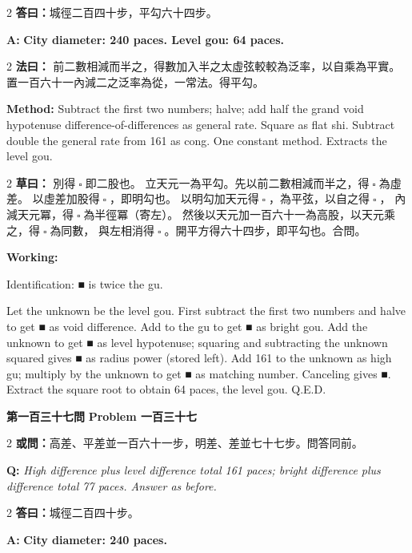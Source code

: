 \documentclass[11pt,a4paper]{article}
\let\origsquare\square
\renewcommand{\square}{\ensuremath{\origsquare}}%
\newcommand{\wen}[1]{%
  \par\vspace{0.5em}%
  \noindent\textcolor{problemcolor}{\textbf{第#1問}}%
  \hfill\textcolor{problemcolor}{\textbf{Problem #1}}\par\nopagebreak%
  \vspace{0.3em}%
}
\newcommand{\owen}[1]{%
  \noindent\textcolor{problemcolor}{\textbf{或問：}}{\tradfont #1}\par\nopagebreak%
}
\newcommand{\oweneng}[1]{%
  \noindent\textcolor{engcolor}{\textbf{Q: }}{\itshape #1}\par\nopagebreak%
}
\newcommand{\fayue}[1]{%
  \noindent\textcolor{methodcolor}{\textbf{法曰：}}{\tradfont #1}\par\nopagebreak%
}
\newcommand{\fayueeng}[1]{%
  \noindent\textcolor{engcolor}{\textbf{Method: }}{#1}\par\nopagebreak%
}
\newcommand{\tsaoyue}[1]{%
  \noindent\textcolor{workcolor}{\textbf{草曰：}}{\tradfont #1}\par%
}
\newcommand{\tsaoyueeng}[1]{%
  \noindent\textcolor{engcolor}{\textbf{Working: }}{\small #1}\par%
}
\newcommand{\dayue}[1]{%
  \noindent\textcolor{anscolor}{\textbf{答曰：}}{\tradfont #1}\par\nopagebreak%
}
\newcommand{\dayueeng}[1]{%
  \noindent\textcolor{engcolor}{\textbf{A: }}{\bfseries #1}\par\nopagebreak%
}
\begin{document}
\begin{paracol}{2}
\dayue{城徑二百四十步，平勾六十四步。}
\switchcolumn
\dayueeng{City diameter: 240 paces. Level gou: 64 paces.}
\end{paracol}

\begin{paracol}{2}
\fayue{%
前二數相減而半之，得數加入半之太虛弦較較為泛率，以自乘為平實。
置一百六十一內減二之泛率為從，一常法。得平勾。}
\switchcolumn
\fayueeng{%
Subtract the first two numbers; halve; add half the grand void hypotenuse difference-of-differences as general rate. Square as flat shi. Subtract double the general rate from 161 as cong. One constant method. Extracts the level gou.}
\end{paracol}

\begin{paracol}{2}
\tsaoyue{%
別得$ \; \square \; $即二股也。
立天元一為平勾。先以前二數相減而半之，得$ \; \square \; $為虛差。
以虛差加股得$ \; \square \; $，即明勾也。
以明勾加天元得$ \; \square \; $，為平弦，以自之得$ \; \square \; $，
內減天元冪，得$ \; \square \; $為半徑冪（寄左）。
然後以天元加一百六十一為高股，以天元乘之，得$ \; \square \; $為同數，
與左相消得$ \; \square \; $。開平方得六十四步，即平勾也。合問。}
\switchcolumn
\tsaoyueeng{%
Identification: ■ is twice the gu.

Let the unknown be the level gou. First subtract the first two numbers and halve to get ■ as void difference. Add to the gu to get ■ as bright gou. Add the unknown to get ■ as level hypotenuse; squaring and subtracting the unknown squared gives ■ as radius power (stored left). Add 161 to the unknown as high gu; multiply by the unknown to get ■ as matching number. Canceling gives ■. Extract the square root to obtain 64 paces, the level gou. Q.E.D.}
\end{paracol}

\vspace{0.5cm}

\wen{一百三十七}

\begin{paracol}{2}
\owen{高差、平差並一百六十一步，明差、差並七十七步。問答同前。}
\switchcolumn
\oweneng{High difference plus level difference total 161 paces; bright difference plus difference total 77 paces. Answer as before.}
\end{paracol}

\begin{paracol}{2}
\dayue{城徑二百四十步。}
\switchcolumn
\dayueeng{City diameter: 240 paces.}
\end{paracol}
\end{document}
